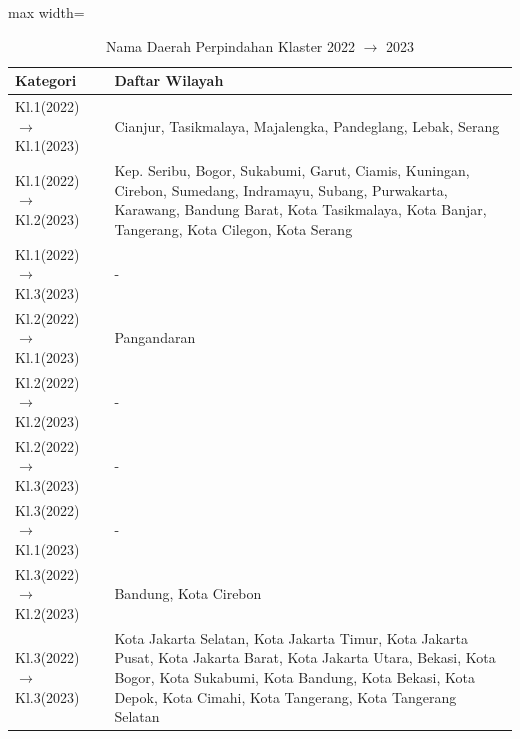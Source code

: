 \begin{table}[H]
\centering
\caption{Nama Daerah Perpindahan Klaster 2022 \(\rightarrow\) 2023} \label{tab:apptransname2022x2023}
\begin{adjustbox}{max width=\textwidth}
\begin{tabular}{|p{4cm}|p{10cm}|}
\hline
\textbf{Kategori} & \textbf{Daftar Wilayah} \\
\hline
Kl.1(2022) \(\rightarrow\) Kl.1(2023) & Cianjur, Tasikmalaya, Majalengka, Pandeglang, Lebak, Serang \\
\hline
Kl.1(2022) \(\rightarrow\) Kl.2(2023) & Kep. Seribu, Bogor, Sukabumi, Garut, Ciamis, Kuningan, Cirebon, Sumedang, Indramayu, Subang, Purwakarta, Karawang, Bandung Barat, Kota Tasikmalaya, Kota Banjar, Tangerang, Kota Cilegon, Kota Serang \\
\hline
Kl.1(2022) \(\rightarrow\) Kl.3(2023) & - \\
\hline
Kl.2(2022) \(\rightarrow\) Kl.1(2023) & Pangandaran \\
\hline
Kl.2(2022) \(\rightarrow\) Kl.2(2023) & - \\
\hline
Kl.2(2022) \(\rightarrow\) Kl.3(2023) & - \\
\hline
Kl.3(2022) \(\rightarrow\) Kl.1(2023) & - \\
\hline
Kl.3(2022) \(\rightarrow\) Kl.2(2023) & Bandung, Kota Cirebon \\
\hline
Kl.3(2022) \(\rightarrow\) Kl.3(2023) & Kota Jakarta Selatan, Kota Jakarta Timur, Kota Jakarta Pusat, Kota Jakarta Barat, Kota Jakarta Utara, Bekasi, Kota Bogor, Kota Sukabumi, Kota Bandung, Kota Bekasi, Kota Depok, Kota Cimahi, Kota Tangerang, Kota Tangerang Selatan \\
\hline
\end{tabular}
\end{adjustbox}
\end{table}